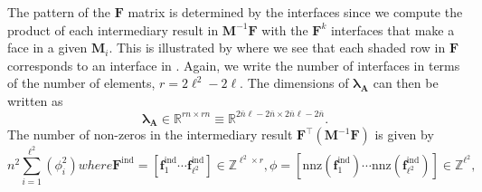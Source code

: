 %
%
%
The pattern of the $\textbf{F}$ matrix is determined by the interfaces since we compute the product of each intermediary result in $\textbf{M}^{-1} \textbf{F}$ with the $\textbf{F}^k$ interfaces that make a face in a given $\textbf{M}_i$. 
This is illustrated by  where we see that each shaded row in $\textbf{F}$ corresponds to an interface in .
Again, we write the number of interfaces in terms of the number of elements, $r = 2\ell^2 - 2\ell$. 
The dimensions of $\symbf{\lambda}_\textbf{A}$ can then be written as 
\begin{equation}
	\symbf{\lambda}_\textbf{A} \in \mathbb{R}^{rn \times rn} \equiv \mathbb{R}^{2\bar{n}\ell - 2\bar{n} \times 2\bar{n}\ell - 2\bar{n}}. 
	\label{eqn:lamsize}
\end{equation}
\noindent
The number of non-zeros in the intermediary result $\textbf{F}^{\intercal}(\textbf{M}^{-1}\textbf{F})$ is given by
\begin{subequations}
\begin{equation}
	n^2 \sum_{i=1}^{\ell^2} (\phi_i^2)
	\label{eqn:nz_sum}
\end{equation}
where
\begin{equation}
	\textbf{F}^{\text{ind}} = \left[\textbf{f}^{\text{ind}}_1 \cdots \textbf{f}^{\text{ind}}_{\ell^2}\right] \in \mathbb{Z}^{\ell^2 \times r},
\end{equation}
\begin{equation}
	\phi = \left[ \text{nnz}(\textbf{f}^{\text{ind}}_1) \cdots \text{nnz}(\textbf{f}^{\text{ind}}_{\ell^2}) \right] \in \mathbb{Z}^{\ell^2}, 
\end{equation}
\end{subequations}
